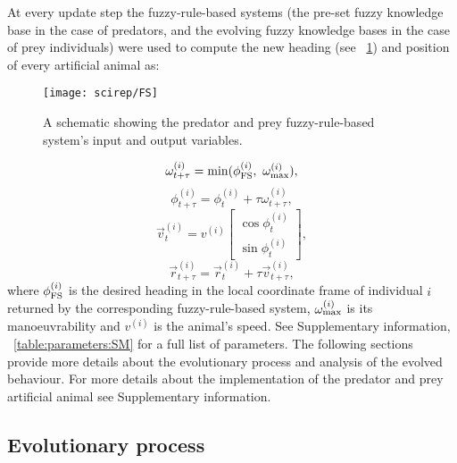 At every update step the fuzzy-rule-based systems (\ie the pre-set fuzzy knowledge base in the case of predators, and the evolving fuzzy knowledge bases in the case of prey individuals) were used to compute the new heading (see \figurename~\ref{figure:FS}) and position of every artificial animal as:
%
\begin{figure}
  \texttt{[image: scirep/FS]}
  \caption{A schematic showing the predator and prey fuzzy-rule-based system's input and output variables.}
  \label{figure:FS}
\end{figure}
%
\begin{equation}
\omega^{(i)}_{t+\tau}= \min(\phi^{(i)}_\textnormal{FS},\ \omega^{(i)}_\textnormal{max}),
\end{equation}
%
\begin{equation}
\phi^{(i)}_{t+\tau}=\phi^{(i)}_t + \tau\omega^{(i)}_{t+\tau},
\end{equation}
%
\begin{equation}
\vec{v}^{(i)}_t=v^{(i)}\begin{bmatrix}\cos\phi^{(i)}_t \\ \sin\phi^{(i)}_t\end{bmatrix},
\end{equation}
%
\begin{equation}
\vec{r}^{(i)}_{t+\tau}= \vec{r}^{(i)}_t + \tau\vec{v}^{(i)}_{t+\tau},
\end{equation}
%
where $\phi^{(i)}_\textnormal{FS}$ is the desired heading in the local coordinate frame of individual $i$ returned by the corresponding fuzzy-rule-based system, $\omega^{(i)}_\textnormal{max}$ is its manoeuvrability and $v^{(i)}$ is the animal's speed. See Supplementary information, \tablename~\ref{table:parameters:SM}
for a full list of parameters. The following sections provide more details about the evolutionary process and analysis of the evolved behaviour. For more details about the implementation of the predator and prey artificial animal see Supplementary information.

\subsection{Evolutionary process}

